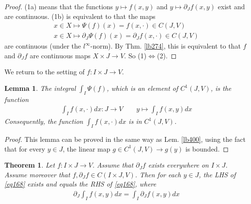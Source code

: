 \documentclass[12pt,b5paper,notitlepage]{article}
\theoremstyle{definition}
\theoremstyle{plain}
\newtheorem{thm}[df]{Theorem}
\newtheorem{lm}[df]{Lemma}
\numberwithin{equation}{section}
\begin{document}
\begin{proof}
(1a) means that the functions $y\mapsto f(x,y)$ and $y\mapsto \partial_Jf(x,y)$ exist and are continuous. (1b) is equivalent to that the maps
\begin{gather*}
x\in X\mapsto\Psi(f)(x)=f(x,\cdot)\in C(J,V)\\
x\in X\mapsto \partial_J\Psi(f)(x)=\partial_Jf(x,\cdot)\in C(J,V)
\end{gather*}
are continuous (under the $l^\infty$-norm). By Thm. \ref{lb274}, this is equivalent to that $f$ and $\partial_Jf$ are continuous maps $X\times J\rightarrow V$. So (1)$\Leftrightarrow$(2).
\end{proof}

We return to the setting of $f:I\times J\rightarrow V$.

\begin{lm}\label{lb403}
The integral  $\int_I\Psi(f)$, which is an element of $C^1(J,V)$, is the function
\begin{align}
\int_If(x,\cdot)dx:J\rightarrow V\qquad y\mapsto \int_I f(x,y)dx
\end{align}
Consequently, the function $\int_If(x,\cdot)dx$ is in $C^1(J,V)$.
\end{lm}


\begin{proof}
This lemma can be proved in the same way as Lem. \ref{lb400}, using the fact that for every $y\in J$, the linear map $g\in C^1(J,V)\rightarrow g(y)$ is bounded.
\end{proof}



\begin{comment}
The inclusion map
\begin{align}
\kappa:C^1(J,V)\rightarrow C(J,V)\qquad g\mapsto g
\end{align}
is a bounded linear map (with operator norm $\leq 1$). What we really want to prove is that $\kappa(\int_I\Psi(f))$, which is an element of $C(J,V)$, is given by the function $y\mapsto \int_If(x,y)dx$. By Thm. \ref{lb392}, we have $\kappa(\int_I\Psi(f))=\int_I\kappa\circ\Psi(f)=\int_I\Phi(f)$ where $\Phi(f)$ is defined as in \eqref{eq167}, i.e. $\Phi(f)(x)=f(x,\cdot)$. By Lem. \ref{lb400}, $\int_I\Phi(f)$ is the function $y\mapsto\int_If(x,y)dx$. This finishes the proof.
\end{comment}



\begin{thm}\label{lb405}
Let $f:I\times J\rightarrow V$. Assume that $\partial_Jf$ exists everywhere on $I\times J$. Assume moreover that $f,\partial_Jf\in C(I\times J,V)$. Then for each $y\in J$, the LHS of \eqref{eq168} exists and equals the RHS of \eqref{eq168}, where
\begin{align}
\partial_J\int_I f(x,y)dx=\int_I\partial_J f(x,y)dx  \label{eq168}
\end{align}
\end{thm}
\end{document}
